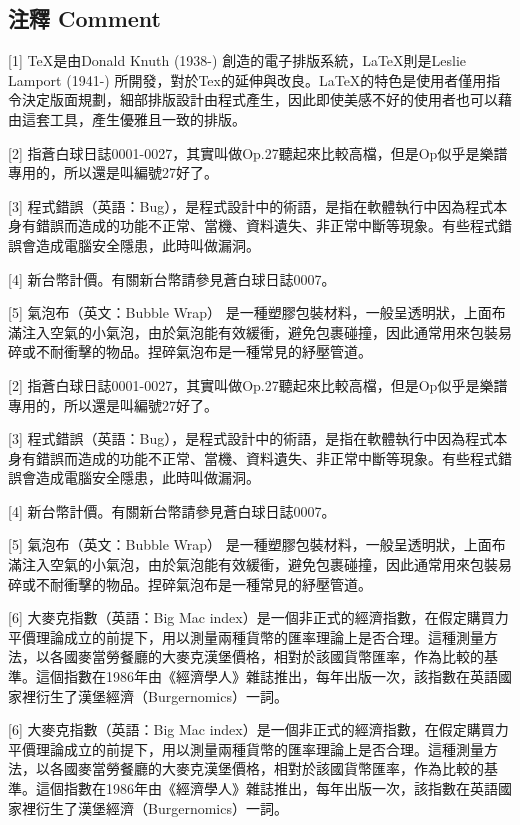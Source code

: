 \documentclass[a5paper, 12pt
]{book}
\begin{document}
\hypertarget{ux6ce8ux91cb-comment-21}{%
\subsection{注釋 Comment}\label{ux6ce8ux91cb-comment-21}}

{[}1{]} TeX是由Donald Knuth (1938-) 創造的電子排版系統，LaTeX則是Leslie
Lamport (1941-)
所開發，對於Tex的延伸與改良。LaTeX的特色是使用者僅用指令決定版面規劃，細部排版設計由程式產生，因此即使美感不好的使用者也可以藉由這套工具，產生優雅且一致的排版。

{[}2{]}
指蒼白球日誌0001-0027，其實叫做Op.27聽起來比較高檔，但是Op似乎是樂譜專用的，所以還是叫編號27好了。

{[}3{]}
程式錯誤（英語：Bug），是程式設計中的術語，是指在軟體執行中因為程式本身有錯誤而造成的功能不正常、當機、資料遺失、非正常中斷等現象。有些程式錯誤會造成電腦安全隱患，此時叫做漏洞。

{[}4{]} 新台幣計價。有關新台幣請參見蒼白球日誌0007。

{[}5{]} 氣泡布（英文：Bubble Wrap）
是一種塑膠包裝材料，一般呈透明狀，上面布滿注入空氣的小氣泡，由於氣泡能有效緩衝，避免包裹碰撞，因此通常用來包裝易碎或不耐衝擊的物品。捏碎氣泡布是一種常見的紓壓管道。

{[}2{]}
指蒼白球日誌0001-0027，其實叫做Op.27聽起來比較高檔，但是Op似乎是樂譜專用的，所以還是叫編號27好了。

{[}3{]}
程式錯誤（英語：Bug），是程式設計中的術語，是指在軟體執行中因為程式本身有錯誤而造成的功能不正常、當機、資料遺失、非正常中斷等現象。有些程式錯誤會造成電腦安全隱患，此時叫做漏洞。

{[}4{]} 新台幣計價。有關新台幣請參見蒼白球日誌0007。

{[}5{]} 氣泡布（英文：Bubble Wrap）
是一種塑膠包裝材料，一般呈透明狀，上面布滿注入空氣的小氣泡，由於氣泡能有效緩衝，避免包裹碰撞，因此通常用來包裝易碎或不耐衝擊的物品。捏碎氣泡布是一種常見的紓壓管道。

{[}6{]} 大麥克指數（英語：Big Mac
index）是一個非正式的經濟指數，在假定購買力平價理論成立的前提下，用以測量兩種貨幣的匯率理論上是否合理。這種測量方法，以各國麥當勞餐廳的大麥克漢堡價格，相對於該國貨幣匯率，作為比較的基準。這個指數在1986年由《經濟學人》雜誌推出，每年出版一次，該指數在英語國家裡衍生了漢堡經濟（Burgernomics）一詞。

{[}6{]} 大麥克指數（英語：Big Mac
index）是一個非正式的經濟指數，在假定購買力平價理論成立的前提下，用以測量兩種貨幣的匯率理論上是否合理。這種測量方法，以各國麥當勞餐廳的大麥克漢堡價格，相對於該國貨幣匯率，作為比較的基準。這個指數在1986年由《經濟學人》雜誌推出，每年出版一次，該指數在英語國家裡衍生了漢堡經濟（Burgernomics）一詞。
\end{document}
